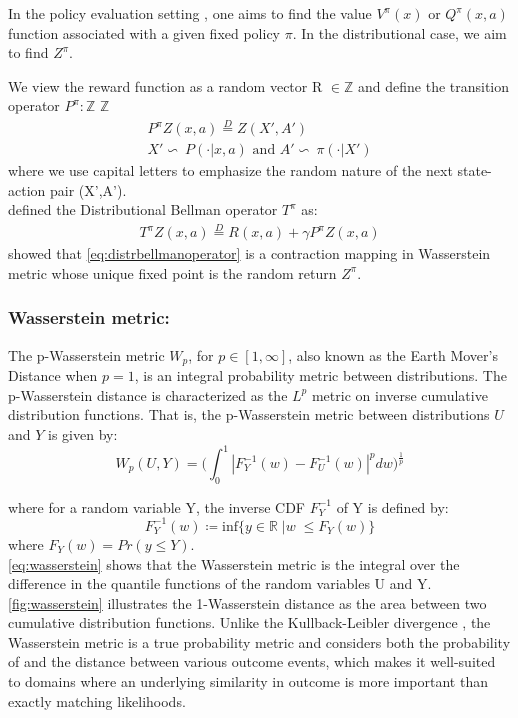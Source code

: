 In the policy evaluation setting \cite{Sutton1998}, one aims to find the value $V^\pi(x)$ or $Q^\pi(x,a)$ 
function associated with a given fixed policy $\pi$. In the distributional case, we aim to find $Z^\pi$.

We view the reward function as a random vector R $\in \mathbb{Z}$ and define the transition
operator 
$P^\pi: \mathbb{Z} $ \ra $\mathbb{Z}$
\begin{eqnarray}
    P^\pi Z(x,a) \stackrel{D}{=} Z(X',A')\\
    X'\backsim\ P(\cdot|x,a) \text{ and } A' \backsim\ \pi(\cdot |X')
\end{eqnarray}
where we use capital letters to emphasize the random nature of the next state-action pair
 (X',A').\\
\cite{Bellemare2017} defined the Distributional Bellman operator $T^\pi$ as:
\begin{eqnarray}
    T^\pi Z(x,a) \stackrel{D}{=} R(x,a) + \gamma P^\pi Z(x,a) \label{eq:distrbellmanoperator}
\end{eqnarray}
\cite{Bellemare2017} showed that \eqref{eq:distrbellmanoperator} is a contraction
mapping in Wasserstein metric whose unique fixed point is the 
random return $Z^\pi$.

\subsubsection{Wasserstein metric:}
The p-Wasserstein metric $W_p$, for $p \in [1,\infty]$, also known as the Earth Mover's 
Distance when $p=1$, is an integral probability metric between distributions. The
p-Wasserstein distance is characterized 
as the $L^p $ metric on inverse cumulative distribution functions. That is, the
p-Wasserstein metric between distributions $U $ and $Y $ is given by:
\begin{equation}
    W_p(U,Y) = \big (  \int_{0}^{1} | F_Y^{-1}(w) - F_U^{-1}(w) |^p dw   \big )^{\frac{1}{p}} \label{eq:wasserstein}
\end{equation}

where for a random variable Y, the inverse CDF $F_Y^{-1}$ of Y is defined by:
\begin{equation}
    F_Y^{-1}(w) \coloneqq \text{inf} \big\{ y \in \mathbb{R} \; | w \; \leq   F_Y(w)    \big\}
\end{equation}
where $F_Y(w) = Pr(y \leq Y)$. \\
\ref{eq:wasserstein} shows that the Wasserstein metric is the integral over the difference in the quantile functions 
of the random variables U and Y.
\ref{fig:wasserstein} illustrates the 1-Wasserstein distance as the area between two cumulative distribution
functions.
Unlike the Kullback-Leibler divergence , the Wasserstein metric is a true probability
metric and considers both the probability of
and the distance between various outcome events, which makes it well-suited to domains 
where an underlying similarity in outcome is more important than exactly matching likelihoods.

